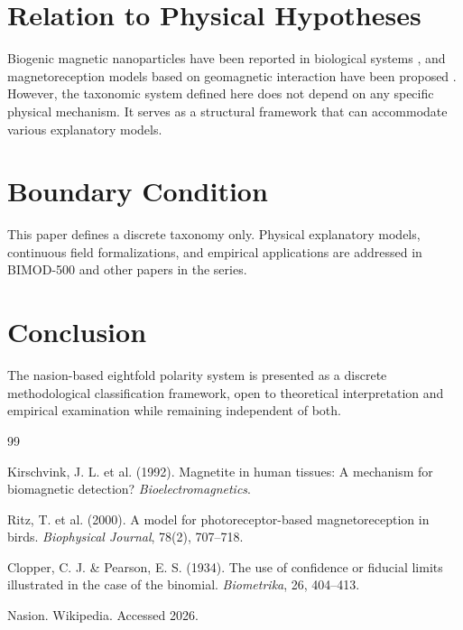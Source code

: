 \documentclass[12pt,a4paper]{article}
\begin{document}
\section{Relation to Physical Hypotheses}

Biogenic magnetic nanoparticles have been reported in biological systems \citep{Kirschvink1992}, and magnetoreception models based on geomagnetic interaction have been proposed \citep{Ritz2000}. However, the taxonomic system defined here does not depend on any specific physical mechanism. It serves as a structural framework that can accommodate various explanatory models.

\section{Boundary Condition}

This paper defines a discrete taxonomy only. 
Physical explanatory models, continuous field formalizations, and empirical applications are addressed in BIMOD-500 and other papers in the series.

\section{Conclusion}

The nasion-based eightfold polarity system is presented as a discrete methodological classification framework, open to theoretical interpretation and empirical examination while remaining independent of both.

\begin{thebibliography}{99}

Kirschvink, J. L. et al. (1992). Magnetite in human tissues: A mechanism for biomagnetic detection? \textit{Bioelectromagnetics}.

Ritz, T. et al. (2000). A model for photoreceptor-based magnetoreception in birds. \textit{Biophysical Journal}, 78(2), 707–718.

Clopper, C. J. \& Pearson, E. S. (1934). The use of confidence or fiducial limits illustrated in the case of the binomial. \textit{Biometrika}, 26, 404–413.

Nasion. Wikipedia. Accessed 2026.

\end{thebibliography}
\end{document}
